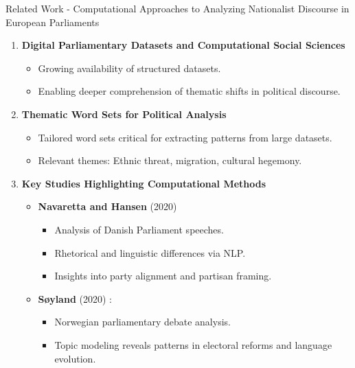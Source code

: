 \documentclass[8pt]{beamer}
\begin{document}
\begin{frame}{Related Work - Computational Approaches to Analyzing
Nationalist Discourse in European Parliaments}

\begin{enumerate}
    \item \textbf{Digital Parliamentary Datasets and Computational Social Sciences}
        \begin{itemize}
            \item Growing availability of structured datasets.
            \item  Enabling deeper comprehension of thematic shifts in political discourse.
        \end{itemize}
    \item \textbf{Thematic Word Sets for Political Analysis}

        \begin{itemize}
            \item Tailored word sets critical for extracting patterns from large datasets.
            \item  Relevant themes: Ethnic threat, migration, cultural hegemony.
        \end{itemize}
    \item \textbf{Key Studies Highlighting Computational Methods}
        \begin{itemize}
            \item \textbf{Navaretta and Hansen }(2020) \cite{navarretta2020identifying}
        
            \begin{itemize}
                \item Analysis of Danish Parliament speeches.
                \item Rhetorical and linguistic differences via NLP.
                \item Insights into party alignment and partisan framing.
            \end{itemize}
            \item \textbf{Søyland} (2020) \cite{soyland2020parliamentary}:
            \begin{itemize}
                \item Norwegian parliamentary debate analysis.
                \item  Topic modeling reveals patterns in electoral reforms and language evolution.
            \end{itemize}
        \end{itemize}


\end{enumerate}
\end{frame}
\end{document}

